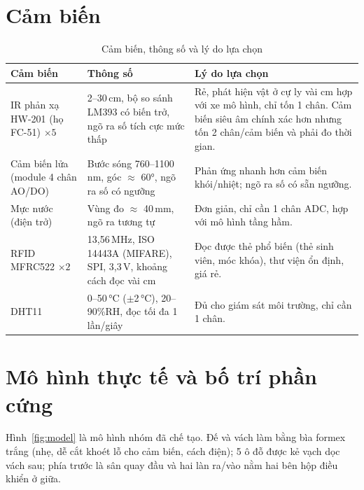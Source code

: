 \section{Cảm biến}
\begin{table}[H]
\centering\small
\caption{Cảm biến, thông số và lý do lựa chọn}\label{tab:sensors}
\begin{tabularx}{\linewidth}{@{}p{2.9cm}p{4.0cm}X@{}}
\toprule
\textbf{Cảm biến} & \textbf{Thông số} & \textbf{Lý do lựa chọn} \\ \midrule
IR phản xạ HW-201 (họ FC-51) $\times5$ & 2–30\,cm, bộ so sánh LM393 có biến trở, ngõ ra số tích cực mức thấp & Rẻ, phát hiện vật ở cự ly vài cm hợp với xe mô hình, chỉ tốn 1 chân. Cảm biến siêu âm chính xác hơn nhưng tốn 2 chân/cảm biến và phải đo thời gian. \\
Cảm biến lửa (module 4 chân AO/DO) & Bước sóng 760–1100\,nm, góc $\approx$ 60°, ngõ ra số có ngưỡng & Phản ứng nhanh hơn cảm biến khói/nhiệt; ngõ ra số có sẵn ngưỡng. \\
Mực nước (điện trở) & Vùng đo $\approx$ 40\,mm, ngõ ra tương tự & Đơn giản, chỉ cần 1 chân ADC, hợp với mô hình tầng hầm. \\
RFID MFRC522 $\times2$ & 13,56\,MHz, ISO 14443A (MIFARE), SPI, 3,3\,V, khoảng cách đọc vài cm & Đọc được thẻ phổ biến (thẻ sinh viên, móc khóa), thư viện ổn định, giá rẻ. \\
DHT11 & 0–50\,°C ($\pm$2\,°C), 20–90\%RH, đọc tối đa 1 lần/giây & Đủ cho giám sát môi trường, chỉ cần 1 chân. \\
\bottomrule
\end{tabularx}
\end{table}

\section{Mô hình thực tế và bố trí phần cứng}\label{sec:mohinh}
Hình~\ref{fig:model} là mô hình nhóm đã chế tạo. Đế và vách làm bằng bìa formex
trắng (nhẹ, dễ cắt khoét lỗ cho cảm biến, cách điện); 5 ô đỗ được kẻ vạch dọc vách
sau; phía trước là sân quay đầu và hai làn ra/vào nằm hai bên hộp điều khiển ở giữa.

